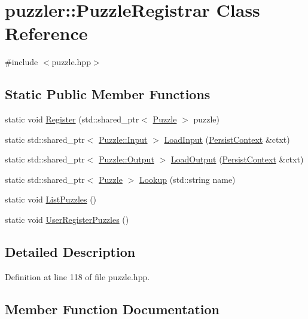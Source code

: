 \hypertarget{a00028}{}\section{puzzler\+:\+:Puzzle\+Registrar Class Reference}
\label{a00028}


{\ttfamily \#include $<$puzzle.\+hpp$>$}

\subsection*{Static Public Member Functions}
\begin{DoxyCompactItemize}
\item 
static void \hyperlink{a00028_a50f2d83deab9ca28813010f52331d146}{Register} (std\+::shared\+\_\+ptr$<$ \hyperlink{a00026}{Puzzle} $>$ puzzle)
\item 
static std\+::shared\+\_\+ptr$<$ \hyperlink{a00009}{Puzzle\+::\+Input} $>$ \hyperlink{a00028_a94cc3b4d21c56452a7e849573b2f8a71}{Load\+Input} (\hyperlink{a00025}{Persist\+Context} \&ctxt)
\item 
static std\+::shared\+\_\+ptr$<$ \hyperlink{a00023}{Puzzle\+::\+Output} $>$ \hyperlink{a00028_ad33e265cd00848c9b70a13f5e0c0fa20}{Load\+Output} (\hyperlink{a00025}{Persist\+Context} \&ctxt)
\item 
static std\+::shared\+\_\+ptr$<$ \hyperlink{a00026}{Puzzle} $>$ \hyperlink{a00028_ae50458f545f775bf73d7ca3505e4d0a6}{Lookup} (std\+::string name)
\item 
static void \hyperlink{a00028_ab93419eaea868e545801b8c111aad90a}{List\+Puzzles} ()
\item 
static void \hyperlink{a00028_a69b90f3718cbe855d87a1ea89a3ea3ac}{User\+Register\+Puzzles} ()
\end{DoxyCompactItemize}


\subsection{Detailed Description}


Definition at line 118 of file puzzle.\+hpp.



\subsection{Member Function Documentation}
\hypertarget{a00028_ab93419eaea868e545801b8c111aad90a}{}
